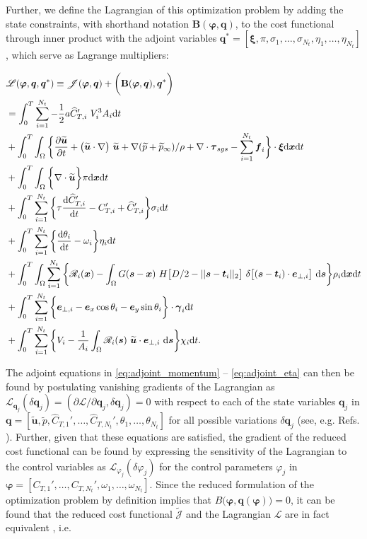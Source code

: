 \documentclass[energies,article,submit,moreauthors,latex,10pt,a4paper]{mdpi}
\newcommand{\ds}{~\text{d}\boldsymbol{s}}
\newcommand{\bs}[1]{\boldsymbol{#1}}
\newcommand{\dx}{\text{d}\boldsymbol{x}}
\newcommand{\dt}{\text{d}t}
\newcommand{\ddt}[1]{\frac{\text{d} #1}{\text{d} t}}
\newcommand{\stint}{\int_{0}^{T} \int_{\Omega}}
\newcommand{\sint}{\int_{\Omega}}
\newcommand{\Tint}{\int_{0}^{T}}
\newcommand{\utilde}{\widetilde{\bs{u}}}
\newcommand{\ptilde}{\widetilde{p}}
\newcommand{\ctnhat}[1]{\widehat{C}_{T,#1}'}
\newcommand{\ctihat}{\widehat{C}_{T,i}'}
\newcommand{\cti}{C_{T,i}'}
\newcommand{\ctn}[1]{C_{T,#1}'}
\newcommand{\R}{\mathscr{R}}
\newcommand{\J}{\mathscr{J}}
\newcommand{\Jtilde}{\tilde{\mathscr{J}}}
\newcommand{\Lagr}{\mathscr{L}}
\newcommand{\eperpi}{\bs{e}_{\perp,i}}
\newcommand{\vi}{\frac{1}{A_i} \sint \R_i (\bs{s})~\utilde \cdot \eperpi \ds}
\newcommand{\innerproduct}[2]{\bigg( #1, #2 \bigg)}
\newcommand{\sumturbines}{\sum_{i=1}^{N_t}}
\newcommand{\diracdelta}{{\delta}}
\begin{document}
\noindent Further, we define the Lagrangian of this optimization problem by adding the state constraints, with shorthand notation $\bs{B}(\bs{\varphi}, \bs{q})$, to the cost functional through inner product with the adjoint variables $\bs{q}^* = [\bs{\xi}, \pi, \sigma_1, \dots, \sigma_{N_t}, \eta_1, \dots, \eta_{N_t}]$, which serve as Lagrange multipliers:

\begin{align}
&\mathscr{L}(\bs{\varphi}, \bs{q}, \bs{q}^*) \equiv \J(\bs{\varphi}, \bs{q}) + \innerproduct{\bf{B}(\bs{\varphi}, \bs{q})}{\bs{q}^*} \nonumber\\
&= \Tint \sum_{i=1}^{N_t} - \frac{1}{2} a \ctihat~V_i^3 A_i \dt \nonumber\\
&+ \stint \bigg\{ \frac{\partial \utilde}{\partial t} + \big(\utilde \cdot \nabla \big)~ \utilde + \nabla (\ptilde + \ptilde_\infty) / \rho + \nabla \cdot \boldsymbol{\tau}_{sgs}  - \sum_{i=1}^{N_t} \bs{f}_i \bigg\} \cdot \bs{\xi} \dx \dt \nonumber\\
&+ \stint \bigg\{ \nabla \cdot \utilde \bigg\} \pi \dx \dt \nonumber\\
&+ \Tint \sumturbines \bigg\{  \tau \ddt{\ctihat} - \cti + \ctihat \bigg\} \sigma_i \dt  \nonumber\\
&+ \Tint \sumturbines \bigg\{ \ddt{\theta_i} - \omega_i \bigg\} \eta_i\dt \nonumber\\
&+ \stint \sumturbines \bigg\{ \R_i(\bs{x}) - \sint G(\bs{s} - \bs{x})~H\big[D/2 - \vert\vert \bs{s} - \bs{t}_i \vert\vert_2\big]~\diracdelta \big[ (\bs{s} - \bs{t}_i)\cdot \eperpi \big] \ds \bigg\} \rho_i \dx \dt \nonumber\\
&+ \Tint \sumturbines \bigg\{ \eperpi - \bs{e}_x \cos \theta_i  - \bs{e}_y \sin \theta_i \bigg\} \cdot \bs{\gamma}_i \dt \nonumber \label{eq:lagrangian_derivation}\\
&+ \Tint \sumturbines \bigg\{ V_i - \vi \bigg\} \chi_i \dt .
\end{align}

\noindent The adjoint equations in \eqref{eq:adjoint_momentum} -- \eqref{eq:adjoint_eta} can then be found by postulating vanishing gradients of the Lagrangian as  $\mathscr{L}_{\bs{q}_j}(\delta \bs{q}_j) = (\partial \mathscr{L}/\partial \bs{q}_j, \delta \bs{q}_j) = 0$ with respect to each of the state variables $\bs{q}_j$ in $\bs{q} = [\utilde, \ptilde, \ctnhat{1}, \dots, \ctnhat{N_t}, \theta_1, \dots, \theta_{N_t}]$ for all possible variations $\delta \bs{q}_j$ (see, e.g. Refs. \cite{troltzsch,borzinschulz,hinze2008optimization}).  Further, given that these equations are satisfied, the gradient of the reduced cost functional can be found by expressing the sensitivity of the Lagrangian to the control variables as $\Lagr_{\varphi_j}(\delta \varphi_j)$ for the control parameters $\varphi_j$ in $\bs{\varphi} = [\ctn{1}, \dots, \ctn{N_t}, \omega_1, \dots, \omega_{N_t}]$. 
Since the reduced formulation of the optimization problem by definition implies that $B\big(\bs{\varphi}, \bs{q}(\bs{\varphi})\big)=0$, it can be found that the reduced cost functional $\Jtilde$ and the Lagrangian $\Lagr$ are in fact equivalent \cite{hinze2008optimization}, i.e.
\end{document}
